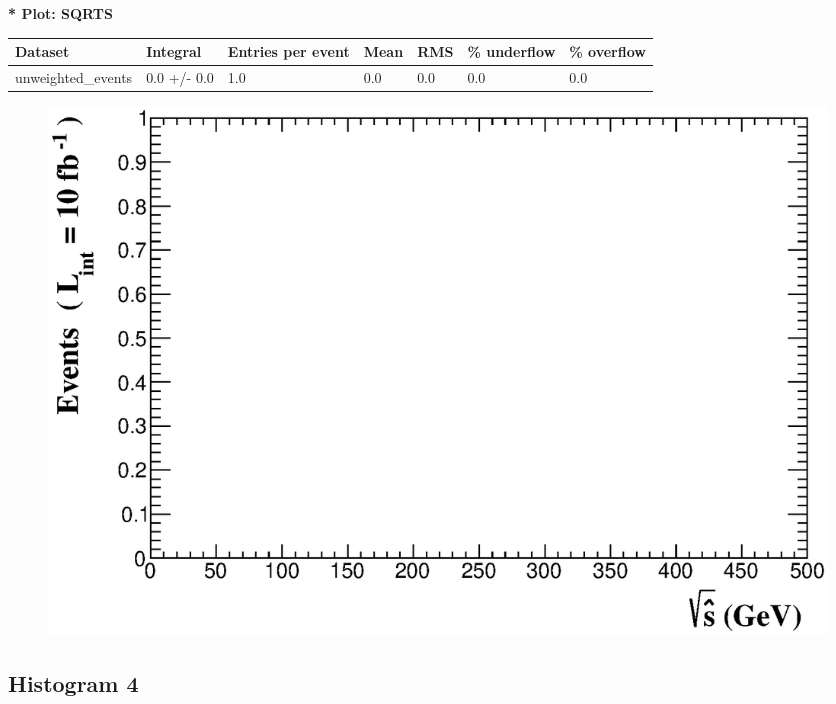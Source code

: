 \documentclass[a4paper, 10pt]{article}
\begin{document}
\textbf{* Plot: SQRTS}\\
   \begin{table}[H]
  \begin{center}
    \begin{tabular}{|m{23.0mm}|m{23.0mm}|m{18.0mm}|m{19.0mm}|m{19.0mm}|m{19.0mm}|m{19.0mm}|}
      \hline
      {\cellcolor{yellow}         Dataset}& {\cellcolor{yellow}         Integral}& {\cellcolor{yellow}         Entries per event}& {\cellcolor{yellow}         Mean}& {\cellcolor{yellow}         RMS}& {\cellcolor{yellow}         \% underflow}& {\cellcolor{yellow}         \% overflow}\\
      \hline
      {\cellcolor{white}         unweighted\_events}& {\cellcolor{white}         0.0 +/\-- 0.0}& {\cellcolor{white}         1.0}& {\cellcolor{white}         0.0}& {\cellcolor{white}         0.0}& {\cellcolor{green}         0.0}& {\cellcolor{green}         0.0}\\
\hline
    \end{tabular}
  \end{center}
\end{table}

\begin{figure}[H]
  \begin{center}
    \includegraphics[scale=0.45]{selection_2.eps}\\
\caption{   }
  \end{center}
\end{figure}
      \newpage
\subsection{ Histogram 4}
\end{document}
